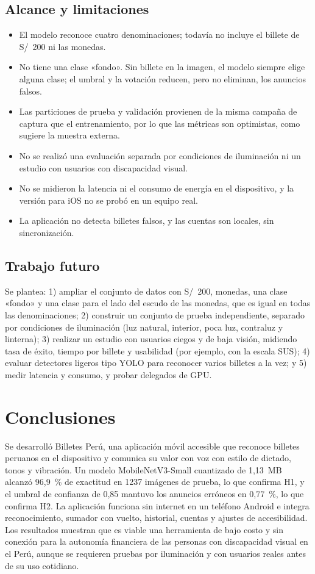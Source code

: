 \documentclass[conference,a4paper]{IEEEtran}
\begin{document}
\subsection{Alcance y limitaciones}

\begin{itemize}
\item El modelo reconoce cuatro denominaciones; todavía no incluye el billete de S/~200 ni las monedas.
\item No tiene una clase «fondo». Sin billete en la imagen, el modelo siempre elige alguna clase; el umbral y la votación reducen, pero no eliminan, los anuncios falsos.
\item Las particiones de prueba y validación provienen de la misma campaña de captura que el entrenamiento, por lo que las métricas son optimistas, como sugiere la muestra externa.
\item No se realizó una evaluación separada por condiciones de iluminación ni un estudio con usuarios con discapacidad visual.
\item No se midieron la latencia ni el consumo de energía en el dispositivo, y la versión para iOS no se probó en un equipo real.
\item La aplicación no detecta billetes falsos, y las cuentas son locales, sin sincronización.
\end{itemize}

\subsection{Trabajo futuro}

Se plantea: 1) ampliar el conjunto de datos con S/~200, monedas, una clase «fondo» y una clase para el lado del escudo de las monedas, que es igual en todas las denominaciones; 2) construir un conjunto de prueba independiente, separado por condiciones de iluminación (luz natural, interior, poca luz, contraluz y linterna); 3) realizar un estudio con usuarios ciegos y de baja visión, midiendo tasa de éxito, tiempo por billete y usabilidad (por ejemplo, con la escala SUS); 4) evaluar detectores ligeros tipo YOLO para reconocer varios billetes a la vez; y 5) medir latencia y consumo, y probar delegados de GPU.

\section{Conclusiones}

Se desarrolló Billetes Perú, una aplicación móvil accesible que reconoce billetes peruanos en el dispositivo y comunica su valor con voz con estilo de dictado, tonos y vibración. Un modelo MobileNetV3-Small cuantizado de 1,13~MB alcanzó 96,9~\% de exactitud en 1237 imágenes de prueba, lo que confirma H1, y el umbral de confianza de 0,85 mantuvo los anuncios erróneos en 0,77~\%, lo que confirma H2. La aplicación funciona sin internet en un teléfono Android e integra reconocimiento, sumador con vuelto, historial, cuentas y ajustes de accesibilidad. Los resultados muestran que es viable una herramienta de bajo costo y sin conexión para la autonomía financiera de las personas con discapacidad visual en el Perú, aunque se requieren pruebas por iluminación y con usuarios reales antes de su uso cotidiano.
\end{document}

